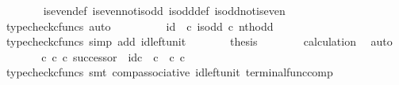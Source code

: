 \begin{isabellebody}
\ \ \ \ \ \ \isamarkupfalse%
\ is{\isacharunderscore}{\kern0pt}even{\isacharunderscore}{\kern0pt}def{}\ is{\isacharunderscore}{\kern0pt}even{\isacharunderscore}{\kern0pt}not{\isacharunderscore}{\kern0pt}is{\isacharunderscore}{\kern0pt}odd\ is{\isacharunderscore}{\kern0pt}odd{\isacharunderscore}{\kern0pt}def{}\ is{\isacharunderscore}{\kern0pt}odd{\isacharunderscore}{\kern0pt}not{\isacharunderscore}{\kern0pt}is{\isacharunderscore}{\kern0pt}even\ \isamarkupfalse%
\ {\isacharparenleft}{\kern0pt}typecheck{\isacharunderscore}{\kern0pt}cfuncs{\isacharcomma}{\kern0pt}\ auto{\isacharparenright}{\kern0pt}\isanewline
\ \ \ \ \isamarkupfalse%
\ \isamarkupfalse%
\ {\isachardoublequoteopen}{\isachardot}{\kern0pt}{\isachardot}{\kern0pt}{\isachardot}{\kern0pt}\ {\isacharequal}{\kern0pt}\ id\ {\isasymOmega}\ {\isasymcirc}\isactrlsub c\ is{\isacharunderscore}{\kern0pt}odd\ {\isasymcirc}\isactrlsub c\ nth{\isacharunderscore}{\kern0pt}odd{\isachardoublequoteclose}\isanewline
\ \ \ \ \ \ \isamarkupfalse%
\ {\isacharparenleft}{\kern0pt}typecheck{\isacharunderscore}{\kern0pt}cfuncs{\isacharcomma}{\kern0pt}\ simp\ add{\isacharcolon}{\kern0pt}\ id{\isacharunderscore}{\kern0pt}left{\isacharunderscore}{\kern0pt}unit{}{\isacharparenright}{\kern0pt}\isanewline
\ \ \ \ \isamarkupfalse%
\ \isamarkupfalse%
\ {\isacharquery}{\kern0pt}thesis\isanewline
\ \ \ \ \ \ \isamarkupfalse%
\ calculation\ \isamarkupfalse%
\ auto\isanewline
\ \ \isamarkupfalse%
\isanewline
\isanewline
\ \ \isamarkupfalse%
\ {\isachardoublequoteopen}{\isacharparenleft}{\kern0pt}{\isasymt}\ {\isasymcirc}\isactrlsub c\ {\isasymbeta}\isactrlbsub {\isasymnat}\isactrlsub c\isactrlesub {\isacharparenright}{\kern0pt}\ {\isasymcirc}\isactrlsub c\ successor\ {\isacharequal}{\kern0pt}\ id\isactrlsub c\ {\isasymOmega}\ {\isasymcirc}\isactrlsub c\ {\isasymt}\ {\isasymcirc}\isactrlsub c\ {\isasymbeta}\isactrlbsub {\isasymnat}\isactrlsub c\isactrlesub {\isachardoublequoteclose}\isanewline
\ \ \ \ \isamarkupfalse%
\ {\isacharparenleft}{\kern0pt}typecheck{\isacharunderscore}{\kern0pt}cfuncs{\isacharcomma}{\kern0pt}\ smt\ comp{\isacharunderscore}{\kern0pt}associative{}\ id{\isacharunderscore}{\kern0pt}left{\isacharunderscore}{\kern0pt}unit{}\ terminal{\isacharunderscore}{\kern0pt}func{\isacharunderscore}{\kern0pt}comp{\isacharparenright}{\kern0pt}\isanewline
{}\isamarkupfalse%

\end{isabellebody}
